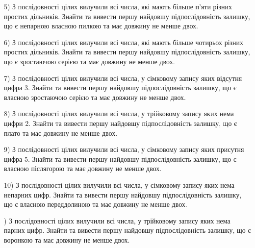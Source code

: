 \documentclass[11pt, ukrainian]{article}
\begin{document}
\par
\vspace{0.9cm}
5) \space 
З послідовності цілих вилучили всі числа, які мають більше п'яти різних простих дільників. Знайти та вивести першу найдовшу підпослідовність залишку, що є непарною власною пилкою та має довжину не менше двох.

\par
\vspace{0.9cm}
6) \space 
З послідовності цілих вилучили всі числа, які мають більше чотирьох різних простих дільників. Знайти та вивести першу найдовшу підпослідовність залишку, що є зростаючою серією та має довжину не менше двох.

\par
\vspace{0.9cm}
7) \space 
З послідовності цілих вилучили всі числа, у сімковому запису яких відсутня цифра 3. Знайти та вивести першу найдовшу підпослідовність залишку, що є власною зростаючою серією та має довжину не менше двох.

\par
\vspace{0.9cm}
8) \space 
З послідовності цілих вилучили всі числа, у трійковому запису яких нема цифри 2. Знайти та вивести першу найдовшу підпослідовність залишку, що є плато та має довжину не менше двох.

\par
\vspace{0.9cm}
9) \space 
З послідовності цілих вилучили всі числа, у сімковому запису яких присутня цифра 5. Знайти та вивести першу найдовшу підпослідовність залишку, що є власною післягорою та має довжину не менше двох.

\par
\vspace{0.9cm}
10) \space 
З послідовності цілих вилучили всі числа, у сімковому запису яких нема непарних цифр. Знайти та вивести першу найдовшу підпослідовність залишку, що є власною переддолиною та має довжину не менше двох.

\par
\vspace{0.9cm}
) \space 
З послідовності цілих вилучили всі числа, у трійковому запису яких нема парних цифр. Знайти та вивести першу найдовшу підпослідовність залишку, що є воронкою та має довжину не менше двох.
\end{document}
